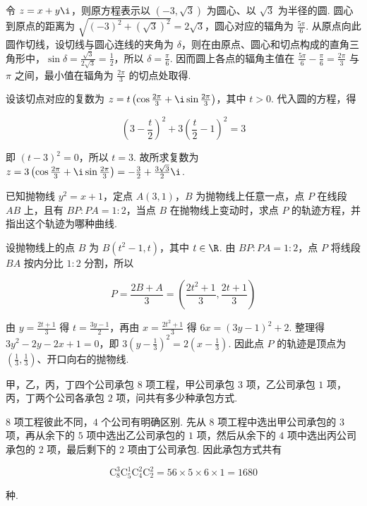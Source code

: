 \begin{solution}
令 \(z=x+y\i\)，则原方程表示以 \((-3,\sqrt{3})\) 为圆心、以 \(\sqrt{3}\) 为半径的圆. 圆心到原点的距离为 \(\sqrt{(-3)^2+(\sqrt{3})^2}=2\sqrt{3}\)，圆心对应的辐角为 \(\frac{5\pi}{6}\). 从原点向此圆作切线，设切线与圆心连线的夹角为 \(\delta\)，则在由原点、圆心和切点构成的直角三角形中，\(\sin\delta=\frac{\sqrt{3}}{2\sqrt{3}}=\frac{1}{2}\)，所以 \(\delta=\frac{\pi}{6}\). 因而圆上各点的辐角主值在 \(\frac{5\pi}{6}-\frac{\pi}{6}=\frac{2\pi}{3}\) 与 \(\pi\) 之间，最小值在辐角为 \(\frac{2\pi}{3}\) 的切点处取得.

设该切点对应的复数为 \(z=t\left(\cos\frac{2\pi}{3}+\i\sin\frac{2\pi}{3}\right)\)，其中 \(t>0\). 代入圆的方程，得

\[
\left(3-\frac{t}{2}\right)^2+3\left(\frac{t}{2}-1\right)^2=3
\]

即 \((t-3)^2=0\)，所以 \(t=3\). 故所求复数为 \(z=3\left(\cos\frac{2\pi}{3}+\i\sin\frac{2\pi}{3}\right)=-\frac{3}{2}+\frac{3\sqrt{3}}{2}\i\).
\end{solution}

\begin{problem}
已知抛物线 \(y^2 = x + 1\)，定点 \(A(3,1)\)，\(B\) 为抛物线上任意一点，点 \(P\) 在线段 \(AB\) 上，且有 \(BP:PA = 1:2\)，当点 \(B\) 在抛物线上变动时，求点 \(P\) 的轨迹方程，并指出这个轨迹为哪种曲线.
\end{problem}

\begin{solution}
设抛物线上的点 \(B\) 为 \(B(t^2-1,t)\)，其中 \(t\in\R\). 由 \(BP:PA=1:2\)，点 \(P\) 将线段 \(BA\) 按内分比 \(1:2\) 分割，所以

\[
P=\frac{2B+A}{3}=\left(\frac{2t^2+1}{3},\frac{2t+1}{3}\right)
\]

由 \(y=\frac{2t+1}{3}\) 得 \(t=\frac{3y-1}{2}\)，再由 \(x=\frac{2t^2+1}{3}\) 得 \(6x=(3y-1)^2+2\). 整理得 \(3y^2-2y-2x+1=0\)，即 \(3\left(y-\frac{1}{3}\right)^2=2\left(x-\frac{1}{3}\right)\). 因此点 \(P\) 的轨迹是顶点为 \(\left(\frac{1}{3},\frac{1}{3}\right)\)、开口向右的抛物线.
\end{solution}

\begin{problem}
甲，乙，丙，丁四个公司承包 \(8\) 项工程，甲公司承包 \(3\) 项，乙公司承包 \(1\) 项，丙，丁两个公司各承包 \(2\) 项，问共有多少种承包方式.
\end{problem}

\begin{solution}
\(8\) 项工程彼此不同，\(4\) 个公司有明确区别. 先从 \(8\) 项工程中选出甲公司承包的 \(3\) 项，再从余下的 \(5\) 项中选出乙公司承包的 \(1\) 项，然后从余下的 \(4\) 项中选出丙公司承包的 \(2\) 项，最后剩下的 \(2\) 项由丁公司承包. 因此承包方式共有

\[
\mathrm C_8^3\mathrm C_5^1\mathrm C_4^2\mathrm C_2^2
=56\times5\times6\times1
=1680
\]

种.
\end{solution}

